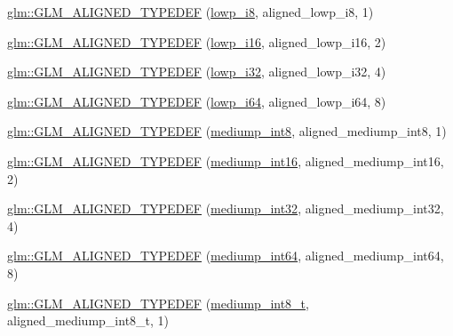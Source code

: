 \begin{DoxyCompactItemize}
\item 
\hyperlink{group__gtx__type__aligned_gac20d508d2ef5cc95ad3daf083c57ec2a}{glm\+::\+G\+L\+M\+\_\+\+A\+L\+I\+G\+N\+E\+D\+\_\+\+T\+Y\+P\+E\+D\+EF} (\hyperlink{group__gtc__type__precision_gaa2e13ee29c90f75658beed6082541097}{lowp\+\_\+i8}, aligned\+\_\+lowp\+\_\+i8, 1)
\item 
\hyperlink{group__gtx__type__aligned_ga50257b48069a31d0c8d9c1f644d267de}{glm\+::\+G\+L\+M\+\_\+\+A\+L\+I\+G\+N\+E\+D\+\_\+\+T\+Y\+P\+E\+D\+EF} (\hyperlink{group__gtc__type__precision_gaf7bbfd31bcec25a416ea94d09efb5451}{lowp\+\_\+i16}, aligned\+\_\+lowp\+\_\+i16, 2)
\item 
\hyperlink{group__gtx__type__aligned_gaa07e98e67b7a3435c0746018c7a2a839}{glm\+::\+G\+L\+M\+\_\+\+A\+L\+I\+G\+N\+E\+D\+\_\+\+T\+Y\+P\+E\+D\+EF} (\hyperlink{group__gtc__type__precision_ga70fd34e8b8cffc92739161284ed77328}{lowp\+\_\+i32}, aligned\+\_\+lowp\+\_\+i32, 4)
\item 
\hyperlink{group__gtx__type__aligned_ga62601fc6f8ca298b77285bedf03faffd}{glm\+::\+G\+L\+M\+\_\+\+A\+L\+I\+G\+N\+E\+D\+\_\+\+T\+Y\+P\+E\+D\+EF} (\hyperlink{group__gtc__type__precision_ga1f4ded25f71c0f3b4518936d50b54b6e}{lowp\+\_\+i64}, aligned\+\_\+lowp\+\_\+i64, 8)
\item 
\hyperlink{group__gtx__type__aligned_gac8cff825951aeb54dd846037113c72db}{glm\+::\+G\+L\+M\+\_\+\+A\+L\+I\+G\+N\+E\+D\+\_\+\+T\+Y\+P\+E\+D\+EF} (\hyperlink{group__gtc__type__precision_ga3ee8faab2278c44c5785af04b7b18a14}{mediump\+\_\+int8}, aligned\+\_\+mediump\+\_\+int8, 1)
\item 
\hyperlink{group__gtx__type__aligned_ga78f443d88f438575a62b5df497cdf66b}{glm\+::\+G\+L\+M\+\_\+\+A\+L\+I\+G\+N\+E\+D\+\_\+\+T\+Y\+P\+E\+D\+EF} (\hyperlink{group__gtc__type__precision_ga4611997edb6c61606daa11990cf08798}{mediump\+\_\+int16}, aligned\+\_\+mediump\+\_\+int16, 2)
\item 
\hyperlink{group__gtx__type__aligned_ga0680cd3b5d4e8006985fb41a4f9b57af}{glm\+::\+G\+L\+M\+\_\+\+A\+L\+I\+G\+N\+E\+D\+\_\+\+T\+Y\+P\+E\+D\+EF} (\hyperlink{group__gtc__type__precision_ga0660a752402702f420f13c686a7fff29}{mediump\+\_\+int32}, aligned\+\_\+mediump\+\_\+int32, 4)
\item 
\hyperlink{group__gtx__type__aligned_gad9e5babb1dd3e3531b42c37bf25dd951}{glm\+::\+G\+L\+M\+\_\+\+A\+L\+I\+G\+N\+E\+D\+\_\+\+T\+Y\+P\+E\+D\+EF} (\hyperlink{group__gtc__type__precision_ga603c695fe5cd677d3f72a81343e19a74}{mediump\+\_\+int64}, aligned\+\_\+mediump\+\_\+int64, 8)
\item 
\hyperlink{group__gtx__type__aligned_ga353fd9fa8a9ad952fcabd0d53ad9a6dd}{glm\+::\+G\+L\+M\+\_\+\+A\+L\+I\+G\+N\+E\+D\+\_\+\+T\+Y\+P\+E\+D\+EF} (\hyperlink{group__gtc__type__precision_ga626ac5f73d3538e62a879d6c56abfb36}{mediump\+\_\+int8\+\_\+t}, aligned\+\_\+mediump\+\_\+int8\+\_\+t, 1)

\end{DoxyCompactItemize}
